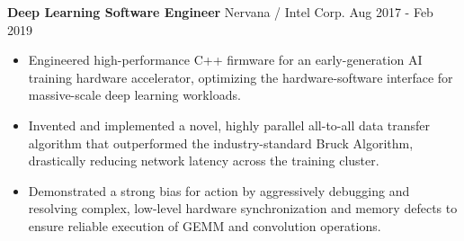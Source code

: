 \textbf{Deep Learning Software Engineer}  Nervana / Intel Corp. \hfill Aug 2017 - Feb 2019

\begin{itemize} \itemsep -2pt

\item Engineered high-performance C++ firmware for an early-generation AI training hardware accelerator, optimizing the hardware-software interface for massive-scale deep learning workloads.

\item Invented and implemented a novel, highly parallel all-to-all data transfer algorithm that outperformed the industry-standard Bruck Algorithm, drastically reducing network latency across the training cluster.

\item Demonstrated a strong bias for action by aggressively debugging and resolving complex, low-level hardware synchronization and memory defects to ensure reliable execution of GEMM and convolution operations.            

\end{itemize}
